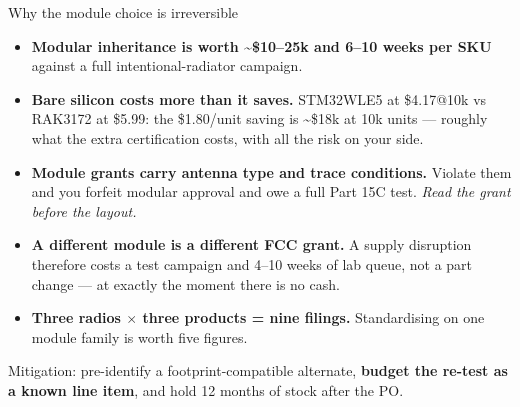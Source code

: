\documentclass[aspectratio=169,t,10pt,xcolor={table,svgnames}]{beamer}
\begin{document}
\begin{frame}{Why the module choice is irreversible}
  \begin{itemize}
    \item \textbf{Modular inheritance is worth \textasciitilde\$10--25k and 6--10 weeks per SKU}
          against a full intentional-radiator campaign.
    \item \textbf{Bare silicon costs more than it saves.} STM32WLE5 at \$4.17@10k vs RAK3172 at
          \$5.99: the \$1.80/unit saving is \textasciitilde\$18k at 10k units --- roughly what the
          extra certification costs, with all the risk on your side.
    \item \textbf{Module grants carry antenna type and trace conditions.} Violate them and you
          forfeit modular approval and owe a full Part 15C test. \emph{Read the grant before the
          layout.}
    \item \textbf{A different module is a different FCC grant.} A supply disruption therefore costs a
          test campaign and 4--10 weeks of lab queue, not a part change --- at exactly the moment
          there is no cash.
    \item \textbf{Three radios $\times$ three products = nine filings.} Standardising on one module
          family is worth five figures.
  \end{itemize}
  \vspace{0.4em}
  \begin{beamercolorbox}[wd=\textwidth,sep=1.4ex]{}
    \color{ink}\small Mitigation: pre-identify a footprint-compatible alternate, \textbf{budget the
    re-test as a known line item}, and hold 12 months of stock after the PO.
  \end{beamercolorbox}
\end{frame}
\end{document}
